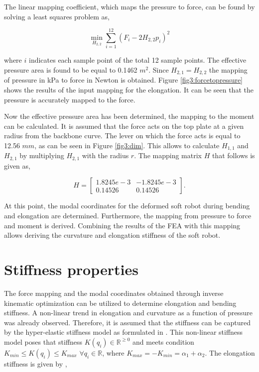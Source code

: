 The linear mapping coefficient, which maps the pressure to force, can be found by solving a least squares problem as,

\begin{equation}
\min_{H_{2,2}} \sum_{i=1}^{12} (F_i - 2 H_{2,2} p_i)^2
\label{eq3:forcefitting}
\end{equation}

where $i$ indicates each sample point of the total 12 sample points. The effective pressure area is found to be equal to 0.1462 $m^2$. Since $H_{2,1} = H_{2,2}$ the mapping of pressure in kPa to force in Newton is obtained. Figure \ref{fig3:forcetopressure} shows the results of the input mapping for the elongation. It can be seen that the pressure is accurately mapped to the force.

Now the effective pressure area has been determined, the mapping to the moment can be calculated. It is assumed that the force acts on the top plate at a given radius from the backbone curve. The lever on which the force acts is equal to 12.56 $mm$, as can be seen in Figure \ref{fig3:dim}. This allows to calculate $H_{1,1}$ and $H_{2,1}$ by multiplying $H_{2,1}$ with the radius $r$. The mapping matrix $H$ that follows is given as,

\begin{equation}
    H =  \begin{bmatrix} 1.8245e-3 & -1.8245e-3 \\
    0.14526 & 0.14526\end{bmatrix}.  
\end{equation}

At this point, the modal coordinates for the deformed soft robot during bending and elongation are determined. Furthermore, the mapping from pressure to force and moment is derived. Combining the results of the FEA with this mapping allows deriving the curvature and elongation stiffness of the soft robot. 




\section{Stiffness properties}

The force mapping and the modal coordinates obtained through inverse kinematic optimization can be utilized to determine elongation and bending stiffness. A non-linear trend in elongation and curvature as a function of pressure was already observed. Therefore, it is assumed that the stiffness can be captured by the hyper-elastic stiffness model as formulated in \cite{Caasenbrood2020StiffnessModel}. This non-linear stiffness model poses that stiffness $K(q_i) \in \mathbb{R}^{\geq 0}$ and meets condition $K_{min} \leq K(q_i) \leq K_{max} \hspace{4pt} \forall q_i \in \mathbb{R}$, where $K_{max} = -K_{min} = \alpha_1 + \alpha_2$. The elongation stiffness is given by \cite{Caasenbrood2020StiffnessModel},

